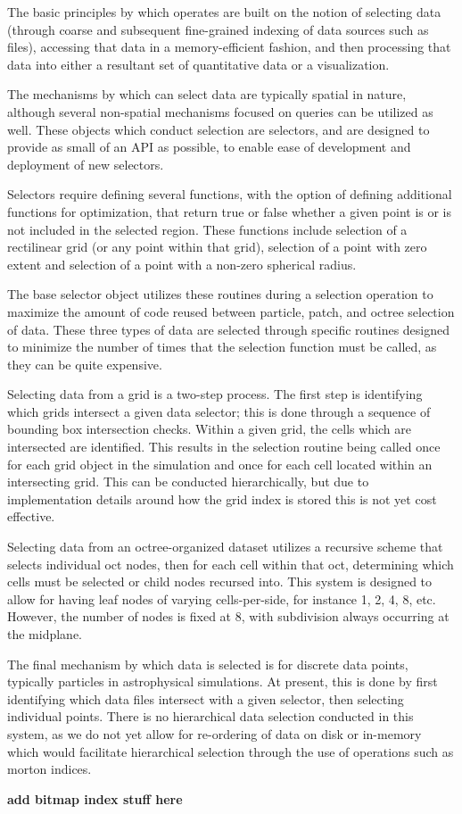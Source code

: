 The basic principles by which \yt{} operates are built on the notion of
selecting data (through coarse and subsequent fine-grained indexing of data
sources such as files), accessing that data in a memory-efficient fashion, and
then processing that data into either a resultant set of quantitative data or a
visualization.

The mechanisms by which \yt{} can select data are typically spatial in nature,
although several non-spatial mechanisms focused on queries can be utilized as
well.  These objects which conduct selection are selectors, and are designed to
provide as small of an API as possible, to enable ease of development and
deployment of new selectors.

Selectors require defining several functions, with the option of defining
additional functions for optimization, that return true or false whether a
given point is or is not included in the selected region.  These functions
include selection of a rectilinear grid (or any point within that grid),
selection of a point with zero extent and selection of a point with a non-zero
spherical radius.

The base selector object utilizes these routines during a selection operation
to maximize the amount of code reused between particle, patch, and octree
selection of data.  These three types of data are selected through specific
routines designed to minimize the number of times that the selection function
must be called, as they can be quite expensive.

Selecting data from a grid is a two-step process.  The first step is
identifying which grids intersect a given data selector; this is done through a
sequence of bounding box intersection checks.  Within a given grid, the cells
which are intersected are identified.  This results in the selection routine
being called once for each grid object in the simulation and once for each cell
located within an intersecting grid.  This can be conducted hierarchically, but
due to implementation details around how the grid index is stored this is not
yet cost effective.

Selecting data from an octree-organized dataset utilizes a recursive scheme
that selects individual oct nodes, then for each cell within that oct,
determining which cells must be selected or child nodes recursed into.  This
system is designed to allow for having leaf nodes of varying cells-per-side,
for instance 1, 2, 4, 8, etc.  However, the number of nodes is fixed at 8, with
subdivision always occurring at the midplane.

The final mechanism by which data is selected is for discrete data points,
typically particles in astrophysical simulations.  At present, this is done
by first identifying which data files intersect with a given selector, then
selecting individual points.  There is no hierarchical data selection conducted
in this system, as we do not yet allow for re-ordering of data on disk or
in-memory which would facilitate hierarchical selection through the use of
operations such as morton indices.

\textbf{add bitmap index stuff here}
